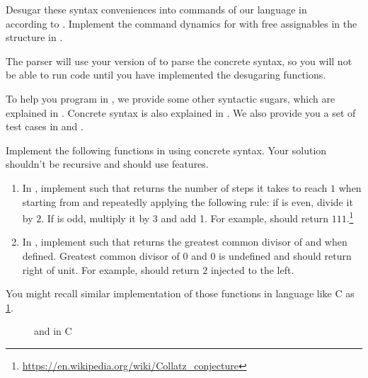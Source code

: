 \documentclass[11pt]{article}
\begin{document}
Desugar these syntax conveniences into commands of our language in \\  according to .
Implement the command dynamics for \LangMA{} with free assignables in the structure 
in .

The parser will use your version of  to parse the concrete syntax, so you will not be able to run \LangMA{} code until you have implemented the desugaring functions.

To help you program in \LangMA{}, we provide some other syntactic sugars, which are explained in . Concrete syntax is also explained in . We also provide you a set of test cases in  and .

Implement the following functions in \LangMA{} using concrete syntax. Your solution shouldn't be recursive and should use \LangMA{} features.
\begin{enumerate}
  \item In , implement  such that  returns the number of steps it takes to reach $1$ when starting from  and repeatedly applying the following rule: if  is even, divide it by $2$. If  is odd, multiply it by $3$ and add 1. For example,  should return $111$.\footnote{\url{https://en.wikipedia.org/wiki/Collatz_conjecture}}
  \item In , implement  such that  returns the greatest common divisor of  and  when defined. Greatest common divisor of $0$ and $0$ is undefined and should return right of unit. For example,  should return $2$ injected to the left.
\end{enumerate}

You might recall similar implementation of those functions in language like C as \ref{fig:ma-programming}.

\begin{figure}[!h]
  \caption{ and  in C}
  \label{fig:ma-programming}
\end{figure}
\end{document}

